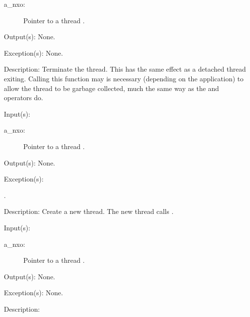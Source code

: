 \begin{capi}
\begin{capilist}
		\begin{description}\item[]
		\item[a\_nxo: ]
			Pointer to a thread .
		\end{description}
	\item[Output(s): ] None.
	\item[Exception(s): ] None.
	\item[Description: ]
		Terminate the thread.  This has the same effect as a detached
		thread exiting.  Calling this function may is necessary
		(depending on the application) to allow the thread to be garbage
		collected, much the same way as the  and
		 operators do.
	\end{capilist}
\label{nxo_thread_thread}
	\begin{capilist}
	\item[Input(s): ]
		\begin{description}\item[]
		\item[a\_nxo: ]
			Pointer to a thread .
		\end{description}
	\item[Output(s): ] None.
	\item[Exception(s): ]
		\begin{description}\item[]
		\item[.]
		\end{description}
	\item[Description: ]
		Create a new thread.  The new thread calls
		.
	\end{capilist}
\label{nxo_thread_}
	\begin{capilist}
	\item[Input(s): ]
		\begin{description}\item[]
		\item[a\_nxo: ]
			Pointer to a thread \classname{nxo}.
		\end{description}
	\item[Output(s): ] None.
	\item[Exception(s): ] None.
	\item[Description: ]

\end{capilist}
\end{capi}
